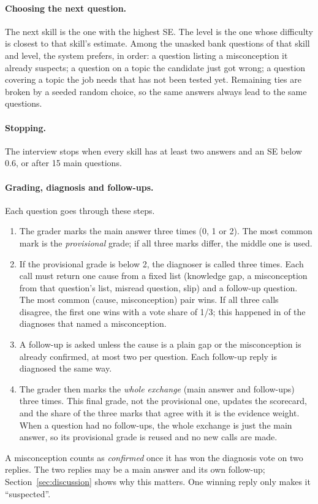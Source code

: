 \documentclass[11pt,a4paper]{article}
\begin{document}
\paragraph{Choosing the next question.} The next skill is the one with the highest SE. The
level is the one whose difficulty is closest to that skill's estimate. Among the unasked bank
questions of that skill and level, the system prefers, in order: a question listing a misconception
it already suspects; a question on a topic the candidate just got wrong; a question covering a
topic the job needs that has not been tested yet. Remaining ties are broken by a seeded random
choice, so the same answers always lead to the same questions.

\paragraph{Stopping.} The interview stops when every skill has at least two answers and an SE
below 0.6, or after 15 main questions.

\paragraph{Grading, diagnosis and follow-ups.} Each question goes through these steps.
\begin{enumerate}[leftmargin=*]
  \item The grader marks the main answer three times (0, 1 or 2). The most common mark is the
  \emph{provisional} grade; if all three marks differ, the middle one is used.
  \item If the provisional grade is below 2, the diagnoser is called three times. Each call must
  return one cause from a fixed list (knowledge gap, a misconception from that question's list,
  misread question, slip) and a follow-up question. The most common (cause, misconception) pair
  wins. If all three calls disagree, the first one wins with a vote share of 1/3; this happened in
  \diagSplit{} of the \diagNamed{} diagnoses that named a misconception.
  \item A follow-up is asked unless the cause is a plain gap or the misconception is already
  confirmed, at most two per question. Each follow-up reply is diagnosed the same way.
  \item The grader then marks the \emph{whole exchange} (main answer and follow-ups) three times.
  This final grade, not the provisional one, updates the scorecard, and the share of the three
  marks that agree with it is the evidence weight. When a question had no follow-ups, the whole
  exchange is just the main answer, so its provisional grade is reused and no new calls are made.
\end{enumerate}
A misconception counts as \emph{confirmed} once it has won the diagnosis vote on two replies. The
two replies may be a main answer and its own follow-up; Section~\ref{sec:discussion} shows why
this matters. One winning reply only makes it ``suspected''.
\end{document}
